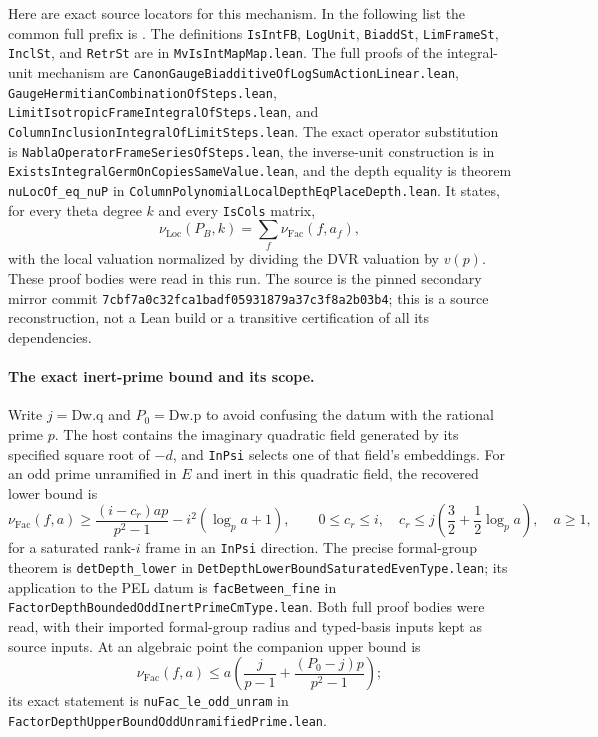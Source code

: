 \documentclass[11pt]{article}
\theoremstyle{definition}\newtheorem{definition}[theorem]{Definition}\newtheorem{remark}[theorem]{Remark}
\begin{document}
Here are exact source locators for this mechanism.  In the
following list the common full prefix is
.
The definitions \texttt{IsIntFB}, \texttt{LogUnit},
\texttt{BiaddSt}, \texttt{LimFrameSt}, \texttt{InclSt}, and
\texttt{RetrSt} are in \texttt{MvIsIntMapMap.lean}.
The full proofs of the integral-unit mechanism are
\nolinkurl{CanonGaugeBiadditiveOfLogSumActionLinear.lean},
\nolinkurl{GaugeHermitianCombinationOfSteps.lean},
\nolinkurl{LimitIsotropicFrameIntegralOfSteps.lean}, and
\nolinkurl{ColumnInclusionIntegralOfLimitSteps.lean}.
The exact operator substitution is
\nolinkurl{NablaOperatorFrameSeriesOfSteps.lean},
the inverse-unit construction is in
\nolinkurl{ExistsIntegralGermOnCopiesSameValue.lean}, and
the depth equality is theorem \texttt{nuLocOf\_eq\_nuP}
in \nolinkurl{ColumnPolynomialLocalDepthEqPlaceDepth.lean}.
It states, for every theta degree $k$ and every
\texttt{IsCols} matrix,
\[
 \nu_{\mathrm{Loc}}(P_B,k)
       =\sum_f\nu_{\mathrm{Fac}}(f,a_f),
 \tag{A9o}
\]
with the local valuation normalized by dividing the DVR
valuation by $v(p)$.  These proof bodies were read in this
run.  The source is the pinned secondary mirror commit
\nolinkurl{7cbf7a0c32fca1badf05931879a37c3f8a2b03b4};
this is a source reconstruction, not a Lean build or a
transitive certification of all its dependencies.

\paragraph{The exact inert-prime bound and its scope.}
Write $j=\mathrm{Dw.q}$ and $P_0=\mathrm{Dw.p}$ to avoid
confusing the datum with the rational prime $p$.
The host contains the imaginary quadratic field generated
by its specified square root of $-d$, and
\texttt{InPsi} selects one of that field's embeddings.
For an odd prime unramified in $E$ and inert in this
quadratic field, the recovered lower bound is
\[
 \nu_{\mathrm{Fac}}(f,a)
 \geq
   \frac{(i-c_r)ap}{p^2-1}
       -i^2(\log_p a+1),\qquad
 0\leq c_r\leq i,\quad
 c_r\leq j\left(\frac32+\frac12\log_p a\right),
 \quad a\geq1,
 \tag{A9p}
\]
for a saturated rank-$i$ frame in an \texttt{InPsi} direction.
The precise formal-group theorem is
\texttt{detDepth\_lower} in
\nolinkurl{DetDepthLowerBoundSaturatedEvenType.lean};
its application to the PEL datum is
\texttt{facBetween\_fine} in
\nolinkurl{FactorDepthBoundedOddInertPrimeCmType.lean}.
Both full proof bodies were read, with their imported
formal-group radius and typed-basis inputs kept as source
inputs.  At an algebraic point the companion upper bound is
\[
 \nu_{\mathrm{Fac}}(f,a)
       \leq a\left(\frac{j}{p-1}
                    +\frac{(P_0-j)p}{p^2-1}\right);
 \tag{A9q}
\]
its exact statement is \texttt{nuFac\_le\_odd\_unram} in
\nolinkurl{FactorDepthUpperBoundOddUnramifiedPrime.lean}.
\end{document}
